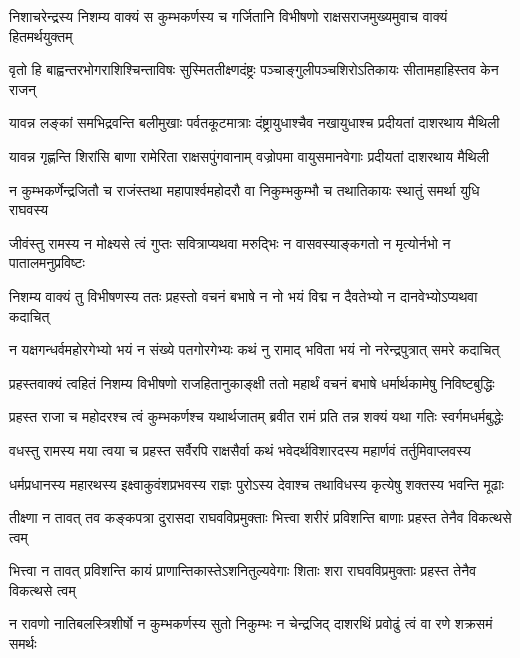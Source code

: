 
\twolineshloka
{निशाचरेन्द्रस्य निशम्य वाक्यं स कुम्भकर्णस्य च गर्जितानि}
{विभीषणो राक्षसराजमुख्यमुवाच वाक्यं हितमर्थयुक्तम्} %

\twolineshloka
{वृतो हि बाह्वन्तरभोगराशिश्चिन्ताविषः सुस्मिततीक्ष्णदंष्ट्रः}
{पञ्चाङ्गुलीपञ्चशिरोऽतिकायः सीतामहाहिस्तव केन राजन्} %

\twolineshloka
{यावन्न लङ्कां समभिद्रवन्ति बलीमुखाः पर्वतकूटमात्राः}
{दंष्ट्रायुधाश्चैव नखायुधाश्च प्रदीयतां दाशरथाय मैथिली} %

\twolineshloka
{यावन्न गृह्णन्ति शिरांसि बाणा रामेरिता राक्षसपुंगवानाम्}
{वज्रोपमा वायुसमानवेगाः प्रदीयतां दाशरथाय मैथिली} %

\twolineshloka
{न कुम्भकर्णेन्द्रजितौ च राजंस्तथा महापार्श्वमहोदरौ वा}
{निकुम्भकुम्भौ च तथातिकायः स्थातुं समर्था युधि राघवस्य} %

\twolineshloka
{जीवंस्तु रामस्य न मोक्ष्यसे त्वं गुप्तः सवित्राप्यथवा मरुद्भिः}
{न वासवस्याङ्कगतो न मृत्योर्नभो न पातालमनुप्रविष्टः} %

\twolineshloka
{निशम्य वाक्यं तु विभीषणस्य ततः प्रहस्तो वचनं बभाषे}
{न नो भयं विद्म न दैवतेभ्यो न दानवेभ्योऽप्यथवा कदाचित्} %

\twolineshloka
{न यक्षगन्धर्वमहोरगेभ्यो भयं न संख्ये पतगोरगेभ्यः}
{कथं नु रामाद् भविता भयं नो नरेन्द्रपुत्रात् समरे कदाचित्} %

\twolineshloka
{प्रहस्तवाक्यं त्वहितं निशम्य विभीषणो राजहितानुकाङ्क्षी}
{ततो महार्थं वचनं बभाषे धर्मार्थकामेषु निविष्टबुद्धिः} %

\twolineshloka
{प्रहस्त राजा च महोदरश्च त्वं कुम्भकर्णश्च यथार्थजातम्}
{ब्रवीत रामं प्रति तन्न शक्यं यथा गतिः स्वर्गमधर्मबुद्धेः} %

\twolineshloka
{वधस्तु रामस्य मया त्वया च प्रहस्त सर्वैरपि राक्षसैर्वा}
{कथं भवेदर्थविशारदस्य महार्णवं तर्तुमिवाप्लवस्य} %

\twolineshloka
{धर्मप्रधानस्य महारथस्य इक्ष्वाकुवंशप्रभवस्य राज्ञः}
{पुरोऽस्य देवाश्च तथाविधस्य कृत्येषु शक्तस्य भवन्ति मूढाः} %

\twolineshloka
{तीक्ष्णा न तावत् तव कङ्कपत्रा दुरासदा राघवविप्रमुक्ताः}
{भित्त्वा शरीरं प्रविशन्ति बाणाः प्रहस्त तेनैव विकत्थसे त्वम्} %

\twolineshloka
{भित्त्वा न तावत् प्रविशन्ति कायं प्राणान्तिकास्तेऽशनितुल्यवेगाः}
{शिताः शरा राघवविप्रमुक्ताः प्रहस्त तेनैव विकत्थसे त्वम्} %

\twolineshloka
{न रावणो नातिबलस्त्रिशीर्षो न कुम्भकर्णस्य सुतो निकुम्भः}
{न चेन्द्रजिद् दाशरथिं प्रवोढुं त्वं वा रणे शक्रसमं समर्थः} %

